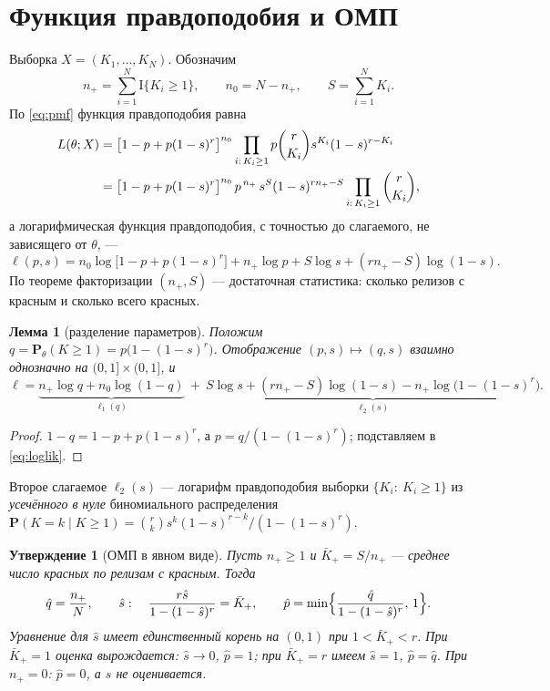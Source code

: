 \documentclass[11pt,a4paper]{article}
\newcommand{\Prob}{\mathbf{P}}
\newcommand{\Ind}{\mathrm{I}}
\theoremstyle{plain}
\newtheorem{lemma}{Лемма}
\newtheorem{proposition}{Утверждение}
\theoremstyle{definition}
\begin{document}
\section{Функция правдоподобия и ОМП}

Выборка $X=(K_1,\dots,K_N)$. Обозначим
\[
n_+=\sum_{i=1}^N\Ind\{K_i\ge1\},\qquad n_0=N-n_+,\qquad S=\sum_{i=1}^NK_i .
\]
По \eqref{eq:pmf} функция правдоподобия равна
\begin{align}
L(\theta;X)&=\bigl[1-p+p(1-s)^r\bigr]^{n_0}\prod_{i:\,K_i\ge1}p\binom r{K_i}s^{K_i}(1-s)^{r-K_i}\notag\\
&=\bigl[1-p+p(1-s)^r\bigr]^{n_0}\,p^{\,n_+}\,s^{S}(1-s)^{rn_+-S}\prod_{i:\,K_i\ge1}\binom r{K_i},\label{eq:lik}
\end{align}
а логарифмическая функция правдоподобия, с точностью до слагаемого, не зависящего от $\theta$, ---
\begin{equation}\label{eq:loglik}
\ell(p,s)=n_0\log\bigl[1-p+p(1-s)^r\bigr]+n_+\log p+S\log s+(rn_+-S)\log(1-s).
\end{equation}
По теореме факторизации $(n_+,S)$ --- достаточная статистика: сколько релизов с красным и сколько всего красных.

\begin{lemma}[разделение параметров]\label{lem:split}
Положим $q=\Prob_\theta(K\ge1)=p\bigl(1-(1-s)^r\bigr)$. Отображение $(p,s)\mapsto(q,s)$ взаимно однозначно на $(0,1]\times(0,1]$, и
\begin{equation}\label{eq:split}
\ell=\underbrace{n_+\log q+n_0\log(1-q)}_{\ell_1(q)}\ +\ \underbrace{S\log s+(rn_+-S)\log(1-s)-n_+\log\bigl(1-(1-s)^r\bigr)}_{\ell_2(s)} .
\end{equation}
\end{lemma}

\begin{proof}
$1-q=1-p+p(1-s)^r$, а $p=q/(1-(1-s)^r)$; подставляем в \eqref{eq:loglik}.
\end{proof}

Второе слагаемое $\ell_2(s)$ --- логарифм правдоподобия выборки $\{K_i:\ K_i\ge1\}$ из \emph{усечённого в нуле} биномиального распределения $\Prob(K=k\mid K\ge1)=\binom rk s^k(1-s)^{r-k}/(1-(1-s)^r)$.

\begin{proposition}[ОМП в явном виде]\label{prop:mle}
Пусть $n_+\ge1$ и $\bar K_+=S/n_+$ --- среднее число красных по релизам с красным. Тогда
\begin{equation}\label{eq:mle}
\hat q=\frac{n_+}N,\qquad
\hat s:\quad \frac{r\hat s}{1-(1-\hat s)^r}=\bar K_+,\qquad
\hat p=\min\Bigl\{\frac{\hat q}{1-(1-\hat s)^r},\,1\Bigr\}.
\end{equation}
Уравнение для $\hat s$ имеет единственный корень на $(0,1)$ при $1<\bar K_+<r$. При $\bar K_+=1$ оценка вырождается: $\hat s\to0$, $\hat p=1$; при $\bar K_+=r$ имеем $\hat s=1$, $\hat p=\hat q$. При $n_+=0$: $\hat p=0$, а $s$ не оценивается.
\end{proposition}
\end{document}
